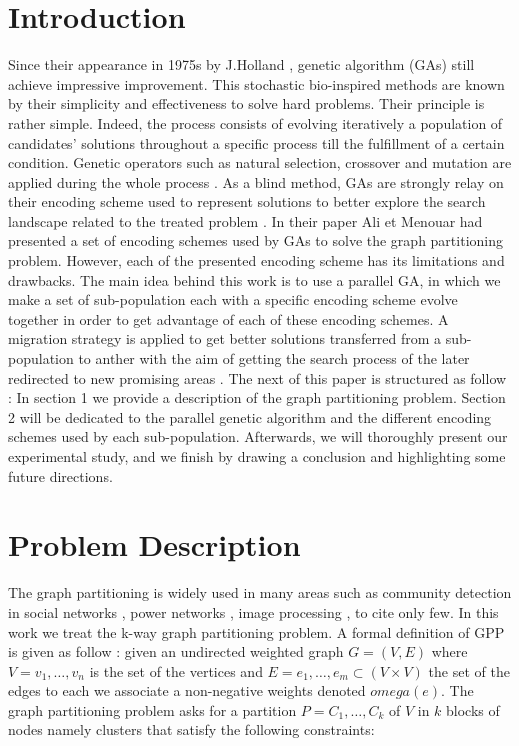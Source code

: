 \documentclass[review]{elsarticle}
\begin{document}
\section{Introduction} 
Since their appearance in 1975s by J.Holland \cite{holland_1975}, genetic algorithm (GAs) still achieve impressive improvement. This stochastic bio-inspired methods are known by their simplicity and effectiveness to solve hard problems. Their principle is rather simple. Indeed, the process consists of evolving iteratively a population of candidates’ solutions throughout a specific process till the fulfillment of a certain condition. Genetic operators such as natural selection, crossover and mutation are applied during the whole process \cite{goldberg1988genetic}.
As a blind method, GAs are strongly relay on their encoding scheme used to represent solutions to better explore the search landscape related to the treated problem \cite{rothlauf_goldberg_2003}.  In their paper \cite{chaouche2019solving} Ali et Menouar had presented a set of encoding schemes used by GAs to solve the graph partitioning problem. However, each of the presented encoding scheme has its limitations and drawbacks. 
The main idea behind this work is to use a parallel GA, in which we make a set of sub-population each with a specific encoding scheme evolve together in order to get advantage of each of these encoding schemes. A migration strategy is applied to get better solutions transferred from a sub-population to anther with the aim of getting the search process of the later redirected to new promising areas \cite{alba1999survey}.
The next of this paper is structured as follow :
In section 1 we provide a description of the graph partitioning problem. Section 2 will be dedicated to the parallel genetic algorithm and the different encoding schemes used by each sub-population. Afterwards, we will thoroughly present our experimental study, and we finish by drawing a conclusion and highlighting some future directions.

\section{Problem Description}
The graph partitioning is widely used in many areas such as community detection in social networks \cite{que2015scalable}, power networks \cite{li2010controlled}, image processing \cite{mittal2022comprehensive}, to cite only few.
In this work we treat the k-way graph partitioning problem. A formal definition of GPP is given as follow :
 given an undirected weighted graph $G=(V,E)$ where $V={v_1,\ldots,v_n}$ is the set of the vertices and $E={e_1, \ldots ,e_m }\subset(V \times V)$ the set of the edges to each we associate a non-negative weights denoted $omega(e)$. The graph partitioning problem asks for a partition $P = {C_1,\ldots,C_k}$ of  $V$ in $k$ blocks of nodes namely clusters that satisfy the following constraints:
\end{document}

